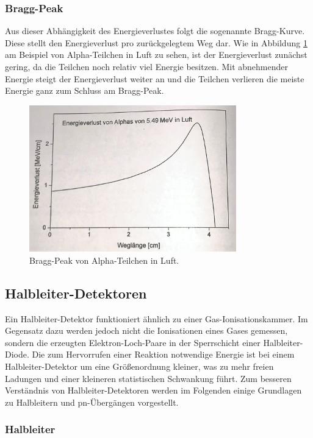 \subsubsection{Bragg-Peak}

Aus dieser Abhängigkeit des Energieverlustes folgt die sogenannte Bragg-Kurve. Diese stellt den Energieverlust pro zurückgelegtem Weg dar. Wie in Abbildung \ref{bragg} am Beispiel von Alpha-Teilchen in Luft zu sehen, ist der Energieverlust zunächst gering, da die Teilchen noch relativ viel Energie besitzen. Mit abnehmender Energie steigt der Energieverlust weiter an und die Teilchen verlieren die meiste Energie ganz zum Schluss am Bragg-Peak.

\begin{figure}[H]
	\centering
	\includegraphics[width=0.8\textwidth]{img/bragg}
	\caption{Bragg-Peak von Alpha-Teilchen in Luft. \cite{bragg}}
	\label{bragg}
\end{figure}

\subsection{Halbleiter-Detektoren}

Ein Halbleiter-Detektor funktioniert ähnlich zu einer Gas-Ionisationskammer. Im Gegensatz dazu werden jedoch nicht die Ionisationen eines Gases gemessen, sondern die erzeugten Elektron-Loch-Paare in der Sperrschicht einer Halbleiter-Diode. Die zum Hervorrufen einer Reaktion notwendige Energie ist bei einem Halbleiter-Detektor um eine Größenordnung kleiner, was zu mehr freien Ladungen und einer kleineren statistischen Schwankung führt. Zum besseren Verständnis von Halbleiter-Detektoren werden im Folgenden einige Grundlagen zu Halbleitern und pn-Übergängen vorgestellt.

\subsubsection{Halbleiter}

